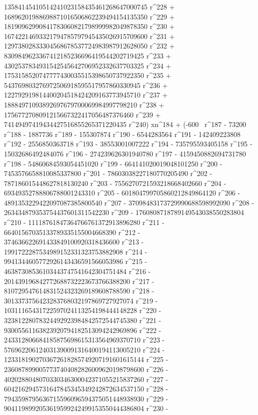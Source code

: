        13584145410514241023158435461268647000745 r^228 + 
       16896201988698871016506862239494154135350 r^229 + 
       18190962990841783060821798999982049878350 r^230 + 
       16742214693321794785797945435026915709600 r^231 + 
       12973802833304568678537724983987912628050 r^232 + 
       8309849623367412185236696419544202719425 r^233 + 
       4302537834931542545642706952332637703325 r^234 + 
       1753158520747777430035515398650737922350 r^235 + 
       543769803276972506918595517957860330945 r^236 + 
       122792919814400204518424209163773945710 r^237 + 
       18884971093892697679700069984997798210 r^238 + 
       1756772708091215667322417056487376460 r^239 + 
       74149497419434427516855265371220435 r^240) xn^184 + (-600 \
r^187 - 73200 r^188 - 1887736 r^189 - 155307874 r^190 - 
       6544283564 r^191 - 142409223808 r^192 - 2556850363718 r^193 - 
       38553001007222 r^194 - 735795593405158 r^195 - 
       15032686492484076 r^196 - 274239626301940780 r^197 - 
       4159450882694731780 r^198 - 54860684593054451020 r^199 - 
       664141020019048101250 r^200 - 7453576658810085337800 r^201 - 
       78603038227180770205490 r^202 - 
       787186015448627818130240 r^203 - 
       7556270721593218668402660 r^204 - 
       69349352788806788001243310 r^205 - 
       601804799705860212849864120 r^206 - 
       4891353229422097087385800540 r^207 - 
       37098483173729990688598992090 r^208 - 
       263434879353754437601311542230 r^209 - 
       1760808718789149543038550283804 r^210 - 
       11118761847364766761372913896280 r^211 - 
       66401567035133789335155004668390 r^212 - 
       374636622691433849100920318436600 r^213 - 
       1991722287534989152331323753882908 r^214 - 
       9941344605772926143436591566053986 r^215 - 
       46387308536103443747541642304751484 r^216 - 
       201439196842772688732223673766388200 r^217 - 
       810729547614831524323269189608788590 r^218 - 
       3013373756423283768032197869727927074 r^219 - 
       10311165431722597024113254198444148228 r^220 - 
       32381228078324492923984842572544745380 r^221 - 
       93005561163823920794182513094242969896 r^222 - 
       243312806684185875698615313564969370710 r^223 - 
       576962206124031390091316400194113005210 r^224 - 
       1233181902703672618285749207191601615144 r^225 - 
       2360878990057737404082826009620198798600 r^226 - 
       4020288048070330346300042371055215837260 r^227 - 
       6042162945731647845345349242872634537150 r^228 - 
       7943598795636715596096594375051448938930 r^229 - 
       9041198992053619599242499153550444386804 r^230 - 
